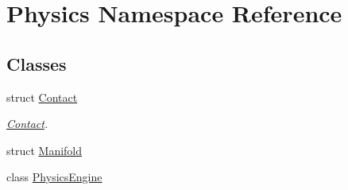 \hypertarget{namespace_physics}{\section{Physics Namespace Reference}
\label{namespace_physics}
}
\subsection*{Classes}
\begin{DoxyCompactItemize}
\item 
struct \hyperlink{struct_physics_1_1_contact}{Contact}
\begin{DoxyCompactList}\small\item\em \hyperlink{struct_physics_1_1_contact}{Contact}. \end{DoxyCompactList}\item 
struct \hyperlink{struct_physics_1_1_manifold}{Manifold}
\item 
class \hyperlink{class_physics_1_1_physics_engine}{Physics\-Engine}
\end{DoxyCompactItemize}
